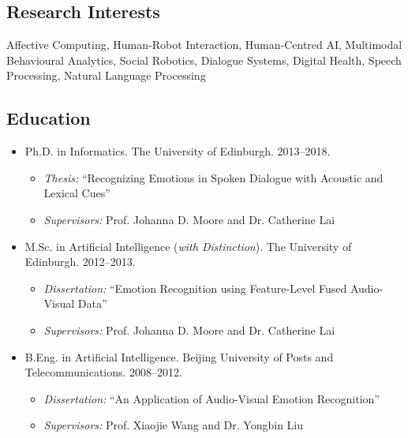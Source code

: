 \documentclass[11pt,letterpaper]{article}
\begin{document}
\bigskip

\subsection*{Research Interests}
Affective Computing, Human-Robot Interaction, Human-Centred AI, Multimodal Behavioural Analytics, Social Robotics, Dialogue Systems, Digital Health, Speech Processing, Natural Language Processing

\subsection*{Education}
\begin{itemize}
  \item Ph.D. in Informatics. The University of Edinburgh. 2013--2018.
  \begin{itemize}
    \item \emph{Thesis:} ``Recognizing Emotions in Spoken Dialogue with Acoustic and Lexical Cues''
    \item \emph{Supervisors:} Prof. Johanna D. Moore and Dr. Catherine Lai
  \end{itemize}
  \item M.Sc. in Artificial Intelligence (\emph{with Distinction}). The University of Edinburgh. 2012--2013.
  \begin{itemize}
    \item \emph{Dissertation:} ``Emotion Recognition using Feature-Level Fused Audio-Visual Data''
    \item \emph{Supervisors:} Prof. Johanna D. Moore and Dr. Catherine Lai
  \end{itemize}
  \item B.Eng. in Artificial Intelligence. Beijing University of Posts and Telecommunications. 2008--2012.
  \begin{itemize}
    \item \emph{Dissertation:} ``An Application of Audio-Visual Emotion Recognition''
    \item \emph{Supervisors:} Prof. Xiaojie Wang and Dr. Yongbin Liu
  \end{itemize}
\end{itemize}
\end{document}
